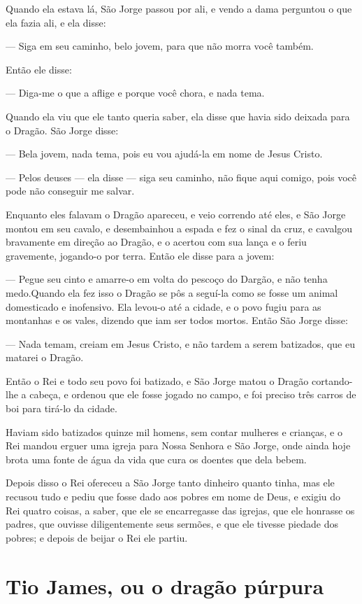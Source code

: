 Quando ela estava lá, São Jorge passou por ali, e vendo a dama
perguntou o que ela fazia ali, e ela disse:

— Siga em seu caminho, belo jovem, para que não morra você também.

Então ele disse:

— Diga-me o que a aflige e porque você chora, e nada tema.

Quando ela viu que ele tanto queria saber, ela disse que havia sido
deixada para o Dragão. São Jorge disse:

— Bela jovem, nada tema, pois eu vou ajudá-la em nome de Jesus Cristo.


— Pelos deuses — ela disse — siga seu caminho, não fique aqui comigo,
pois você pode não conseguir me salvar.

Enquanto eles falavam o Dragão apareceu, e veio correndo até eles, e
São Jorge montou em seu cavalo, e desembainhou a espada e fez o sinal
da cruz, e cavalgou bravamente em direção ao Dragão, e o acertou com
sua lança e o feriu gravemente, jogando-o por terra. Então ele disse
para a jovem:

— Pegue seu cinto e amarre-o em volta do pescoço do Dargão, e não
tenha medo.Quando ela fez isso o Dragão se pôs a seguí-la como se
fosse um animal domesticado e inofensivo. Ela levou-o até a cidade, e
o povo fugiu para as montanhas e os vales, dizendo que iam ser todos
mortos. Então São Jorge disse: 

— Nada temam, creiam em Jesus Cristo, e não tardem a serem batizados,
que eu matarei o Dragão. 

Então o Rei e todo seu povo foi batizado, e São Jorge matou o Dragão
cortando-lhe a cabeça, e ordenou que ele fosse jogado no campo, e foi
preciso três carros de boi para tirá-lo da cidade. 

Haviam sido batizados quinze mil homens, sem contar mulheres e
crianças, e o Rei mandou erguer uma igreja para Nossa Senhora e São
Jorge, onde ainda hoje brota uma fonte de água da vida que cura os
doentes que dela bebem.

Depois disso o Rei ofereceu a São Jorge tanto dinheiro quanto tinha,
mas ele recusou tudo e pediu que fosse dado aos pobres em nome de
Deus, e exigiu do Rei quatro coisas, a saber, que ele se encarregasse
das igrejas, que ele honrasse os padres, que ouvisse diligentemente
seus sermões, e que ele tivesse piedade dos pobres; e depois de
beijar o Rei ele partiu.


\chapter{Tio James, ou o dragão púrpura}

